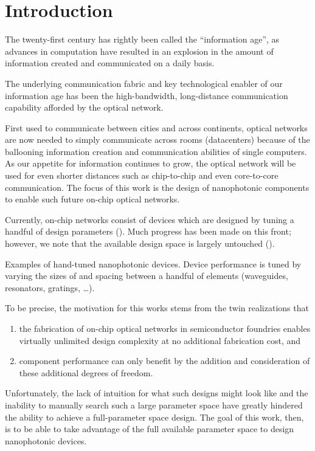 \chapter{Introduction}
The twenty-first century has rightly been called the ``information age'',
    as advances in computation have resulted in an explosion
    in the amount of information created and communicated on a daily basis.

The underlying communication fabric and key technological enabler
    of our information age has been the high-bandwidth, long-distance
    communication capability afforded by the optical network.

First used to communicate between cities and across continents,
    optical networks are now needed to simply communicate across rooms (datacenters)
    because of the ballooning information creation and communication
    abilities of single computers.
As our appetite for information continues to grow,
    the optical network will be used for even shorter distances
    such as chip-to-chip and even core-to-core communication.
The focus of this work is the design of nanophotonic components
    to enable such future on-chip optical networks.


Currently, on-chip networks consist of devices
    which are designed by tuning
    a handful of design parameters\cite{pic1,pic2} ().
Much progress has been made on this front;
    however, we note that the available design space is largely untouched ().

    {Examples of hand-tuned nanophotonic devices\cite{pic1,pic2}.
    Device performance is tuned by varying the sizes of and spacing between
    a handful of elements (waveguides, resonators, gratings, \ldots).}

To be precise, the motivation for this works stems from the twin realizations that
    \begin{enumerate}
    \item the fabrication of on-chip optical networks in semiconductor 
    foundries enables virtually unlimited design complexity at no additional 
    fabrication cost, and
    \item component performance can only benefit by the addition and
    consideration of these additional degrees of freedom.
    \end{enumerate}
Unfortunately, the lack of intuition for what such designs might look like and
    the inability to manually search such a large parameter space
    have greatly hindered the ability to achieve a full-parameter space design.
The goal of this work, then, is to be able to take advantage
    of the full available parameter space to design nanophotonic devices.


